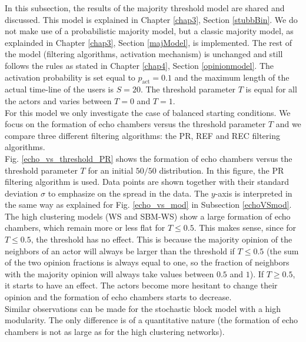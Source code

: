 \documentclass[11 pt , letterpaper , twoside , openright]{book}
\begin{document}
In this subsection, the results of the majority threshold model are shared and discussed. This model is explained in Chapter \ref{chap3}, Section \ref{stubbBin}. We do not make use of a probabilistic majority model, but a classic majority model, as explainded in Chapter \ref{chap3}, Section \ref{majModel}, is implemented. The rest of the model (filtering algorithms, activation mechanism) is unchanged and still follows the rules as stated in Chapter \ref{chap4}, Section \ref{opinionmodel}. The activation probability is set equal to $p_{\text{act}} = 0.1$ and the maximum length of the actual time-line of the users is $S=20$. The threshold parameter $T$ is equal for all the actors and varies between $T=0$ and $T=1$.\\
\newline
For this model we only investigate the case of balanced starting conditions. We focus on the formation of echo chambers versus the threshold parameter $T$ and we compare three different filtering algorithms: the PR, REF and REC filtering algorithms. \\
\newline
Fig. \ref{echo_vs_threshold_PR} shows the formation of echo chambers versus the threshold parameter $T$ for an initial $50/50$ distribution. In this figure, the PR filtering algorithm is used. Data points are shown together with their standard deviation $\sigma$ to emphasize on the spread in the data. The $y$-axis is interpreted in the same way as explained for Fig. \ref{echo_vs_mod} in Subsection \ref{echoVSmod}.\\
\newline
The high clustering models (WS and SBM-WS) show a large formation of echo chambers, which remain more or less flat for $T \leqslant 0.5$. This makes sense, since for $T \leqslant 0.5$, the threshold has no effect. This is because the majority opinion of the neighbors of an actor will always be larger than the threshold if $T \leqslant 0.5$ (the sum of the two opinion fractions is always equal to one, so the fraction of neighbors with the majority opinion will always take values between $0.5$ and $1$). If $T \geqslant 0.5$, it starts to have an effect. The actors become more hesitant to change their opinion and the formation of echo chambers starts to decrease.\\
\newline
Similar observations can be made for the stochastic block model with a high modularity. The only difference is of a quantitative nature (the formation of echo chambers is not as large as for the high clustering networks).\\
\end{document}
